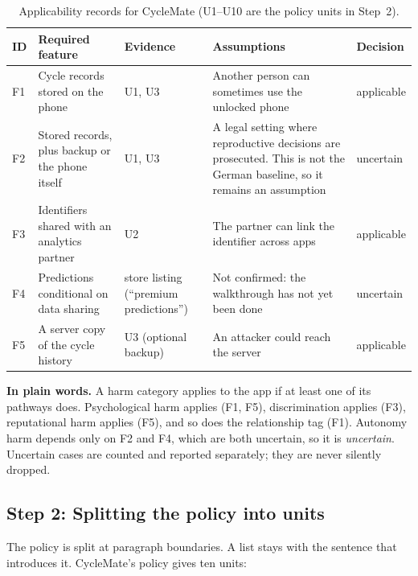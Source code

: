\begin{table}[H]
\centering
\caption{Applicability records for CycleMate (U1--U10 are the policy units
in Step~2).}
\label{tab:we-applicability}
\small
\begin{tabularx}{\textwidth}{@{}l>{\raggedright\arraybackslash}p{3.2cm}
                                   >{\raggedright\arraybackslash}p{2.0cm}
                                   >{\raggedright\arraybackslash}X
                                   >{\raggedright\arraybackslash}p{1.7cm}@{}}
\toprule
\textbf{ID} & \textbf{Required feature} & \textbf{Evidence} &
  \textbf{Assumptions} & \textbf{Decision} \\
\midrule
F1 & Cycle records stored on the phone & U1, U3
   & Another person can sometimes use the unlocked phone & applicable \\
F2 & Stored records, plus backup or the phone itself & U1, U3
   & A legal setting where reproductive decisions are prosecuted. This is not
     the German baseline, so it remains an assumption & uncertain \\
F3 & Identifiers shared with an analytics partner & U2
   & The partner can link the identifier across apps & applicable \\
F4 & Predictions conditional on data sharing & store listing (\enquote{premium
     predictions})
   & Not confirmed: the walkthrough has not yet been done & uncertain \\
F5 & A server copy of the cycle history & U3 (optional backup)
   & An attacker could reach the server & applicable \\
\bottomrule
\end{tabularx}
\end{table}

\noindent\textbf{In plain words.} A harm category applies to the app if at
least one of its pathways does. Psychological harm applies (F1, F5),
discrimination applies (F3), reputational harm applies (F5), and so does the
relationship tag (F1). Autonomy harm depends only on F2 and F4, which are both
uncertain, so it is \emph{uncertain}. Uncertain cases are counted and
reported separately; they are never silently dropped.

\subsection*{Step 2: Splitting the policy into units}

The policy is split at paragraph boundaries. A list stays with the sentence
that introduces it. CycleMate's policy gives ten units:

